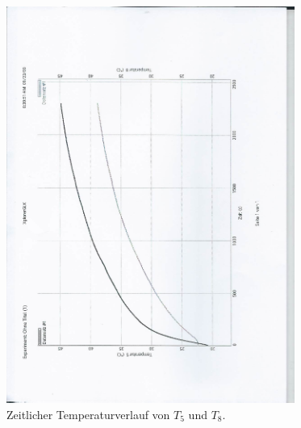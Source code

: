 \begin{figure}
  \centering
  \includegraphics[height=13cm, angle=90]{scan-6.jpg}
  \caption{Zeitlicher Temperaturverlauf von $T_5$ und $T_8$.}
  \label{fig:2}
\end{figure}

